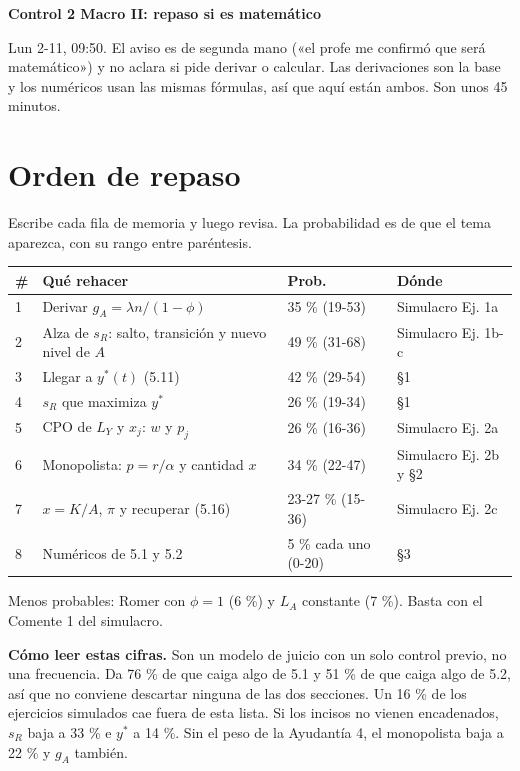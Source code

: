 \documentclass[11pt,a4paper]{article}
\begin{document}
\begin{center}{\LARGE\bfseries Control 2 Macro II: repaso si es matemático}\end{center}

Lun 2-11, 09:50. El aviso es de segunda mano («el profe me confirmó que será matemático») y no aclara si pide derivar o calcular. Las derivaciones son la base y los numéricos usan las mismas fórmulas, así que aquí están ambos. Son unos 45 minutos.

\section*{Orden de repaso}

Escribe cada fila de memoria y luego revisa. La probabilidad es de que el tema aparezca, con su rango entre paréntesis.

\begin{center}\small\begin{tabular}{p{0.6cm}p{9.4cm}p{1.8cm}p{1.9cm}}\toprule
\# & Qué rehacer & Prob. & Dónde \\\midrule
1 & Derivar $g_A = \lambda n/(1-\phi)$ & 35 \% (19-53) & Simulacro Ej. 1a \\
2 & Alza de $s_R$: salto, transición y nuevo nivel de $A$ & 49 \% (31-68) & Simulacro Ej. 1b-c \\
3 & Llegar a $y^*(t)$ (5.11) & 42 \% (29-54) & §1 \\
4 & $s_R$ que maximiza $y^*$ & 26 \% (19-34) & §1 \\
5 & CPO de $L_Y$ y $x_j$: $w$ y $p_j$ & 26 \% (16-36) & Simulacro Ej. 2a \\
6 & Monopolista: $p = r/\alpha$ y cantidad $x$ & 34 \% (22-47) & Simulacro Ej. 2b y §2 \\
7 & $x = K/A$, $\pi$ y recuperar (5.16) & 23-27 \% (15-36) & Simulacro Ej. 2c \\
8 & Numéricos de 5.1 y 5.2 & 5 \% cada uno (0-20) & §3 \\
\bottomrule\end{tabular}\end{center}

Menos probables: Romer con $\phi = 1$ (6 \%) y $L_A$ constante (7 \%). Basta con el Comente 1 del simulacro.

\textbf{Cómo leer estas cifras.} Son un modelo de juicio con un solo control previo, no una frecuencia. Da 76 \% de que caiga algo de 5.1 y 51 \% de que caiga algo de 5.2, así que no conviene descartar ninguna de las dos secciones. Un 16 \% de los ejercicios simulados cae fuera de esta lista. Si los incisos no vienen encadenados, $s_R$ baja a 33 \% e $y^*$ a 14 \%. Sin el peso de la Ayudantía 4, el monopolista baja a 22 \% y $g_A$ también.
\end{document}
